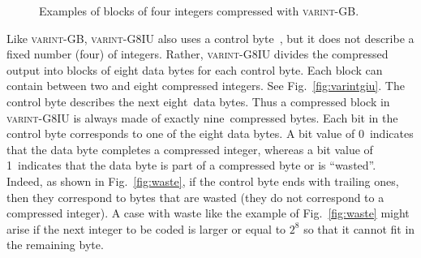 \documentclass[compress]{elsarticle}
\newcommand{\varintgb}{\textsc{varint-GB}}
\newcommand{\varintgiu}{\textsc{varint-G8IU}}
\begin{document}
\begin{figure}
\centering
{}

\caption{\label{fig:groupvarint}Examples of blocks of four integers  compressed with \varintgb{}.}
\end{figure}


Like \varintgb{}, \varintgiu{} also uses a control byte~\cite{Stepanov:2011:SDP:2063576.2063627},
but it does not describe a fixed number (four) of integers.  Rather, \varintgiu{} divides the compressed output into blocks of eight data bytes for each control byte. Each block can contain between two and eight compressed integers. See Fig.~\ref{fig:varintgiu}.
The control byte describes the next eight~data bytes. Thus a compressed block in \varintgiu{} is always made of exactly nine~compressed bytes.
Each bit in the control byte corresponds to one of the eight data bytes. A bit value of 0~indicates that the data byte completes a compressed integer, whereas a bit value of 1~indicates that the data byte is part of a compressed byte or is ``wasted''. Indeed, as shown in Fig.~\ref{fig:waste}, if the control byte ends with trailing ones, then they correspond to bytes that are wasted (they do not correspond to a compressed integer). A case with waste like the example of Fig.~\ref{fig:waste} might arise if the next integer to be coded is larger or equal to $2^{8}$ so that it cannot fit in the remaining byte.
\end{document}
